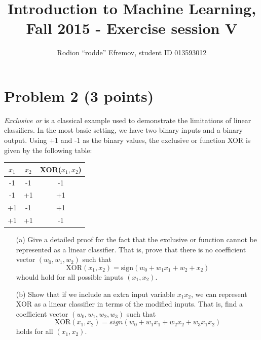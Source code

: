 \documentclass[10pt]{article}
\title{Introduction to Machine Learning, Fall 2015 - Exercise session V}
\author{Rodion ``rodde'' Efremov, student ID 013593012}
\begin{document}
 \maketitle

\section*{Problem 2 (3 points)}
\color{blue} \textit{Exclusive or} is a classical example used to demonstrate the limitations of linear classifiers. In the most basic setting, we have two binary inputs and a binary output. Using +1 and -1 as the binary values, the exclusive or function XOR is given by the following table:
\begin{center}
\begin{tabular}{|cc|c|}
$x_1$ & $x_2$ & XOR($x_1, x_2$) \\
\hline
-1 & -1 & -1 \\
-1 & +1 & +1 \\
+1 & -1 & +1 \\
+1 & +1 & -1 \\
\hline
\end{tabular}
\end{center}
\begin{itemize}
\item[(a)] Give a detailed proof for the fact that the exclusive or function cannot be represented as a linear classifier. That is, prove that there is no coefficient vector $(w_0, w_1, w_2)$ such that
\[
\text{XOR}(x_1, x_2) = \text{sign}(w_0 + w_1 x_1 + w_2 + x_2)
\]
whould hold for all possible inputs $(x_1, x_2)$.
\item[(b)] Show that if we include an extra input variable $x_1x_2$, we can represent XOR as a linear classifier in terms of the modified inputs. That is, find a coefficient vector $(w_0, w_1, w_2, w_3)$ such that
\[
\text{XOR}(x_1, x_2) = sign(w_0 + w_1 x_1 + w_2 x_2 + w_3x_1x_2)
\]
holds for all $(x_1, x_2)$.
\end{itemize}
\color{black}
\end{document}
